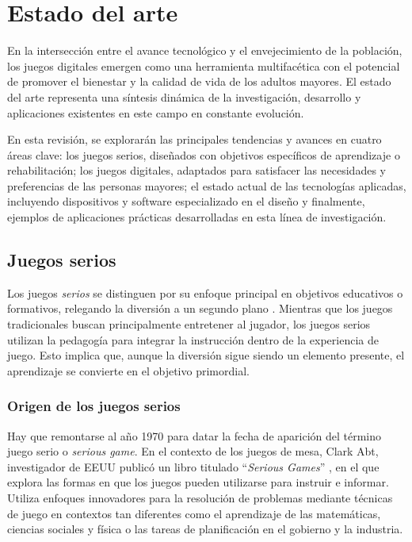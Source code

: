 \section{Estado del arte}

En la intersección entre el avance tecnológico y el envejecimiento de la población, los juegos digitales emergen como una herramienta multifacética con el potencial de promover el bienestar y la calidad de vida de los adultos mayores. El estado del arte representa una síntesis dinámica de la investigación, desarrollo y aplicaciones existentes en este campo en constante evolución.

En esta revisión, se explorarán las principales tendencias y avances en cuatro áreas clave: los juegos serios, diseñados con objetivos específicos de aprendizaje o rehabilitación; los juegos digitales, adaptados para satisfacer las necesidades y preferencias de las personas mayores; el estado actual de las tecnologías aplicadas, incluyendo dispositivos y software especializado en el diseño y finalmente, ejemplos de aplicaciones prácticas desarrolladas en esta línea de investigación.

\subsection{Juegos serios}

Los juegos \textit{serios} se distinguen por su enfoque principal en objetivos educativos o formativos, relegando la diversión a un segundo plano \parencite{juegosSerios}.
Mientras que los juegos tradicionales buscan principalmente entretener al jugador, los juegos serios utilizan la pedagogía para integrar la instrucción dentro de la experiencia de juego. Esto implica que, aunque la diversión sigue siendo un elemento presente, el aprendizaje se convierte en el objetivo primordial.

\subsubsection{Origen de los juegos serios}

Hay que remontarse al año 1970 para datar la fecha de aparición del término juego serio o \textit{serious game}. En el contexto de los juegos de mesa, Clark Abt, investigador de EEUU publicó un libro titulado \enquote{\textit{Serious Games}} \parencite{juegosSerios5}, en el que explora las formas en que los juegos pueden utilizarse para instruir e informar. Utiliza enfoques innovadores para la resolución de problemas mediante técnicas de juego en contextos tan diferentes como el aprendizaje de las matemáticas, ciencias sociales y física o las tareas de planificación en el gobierno y la industria.

